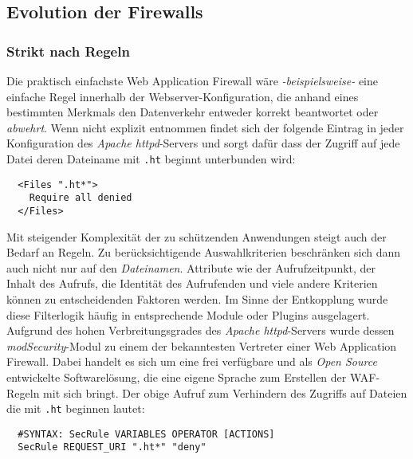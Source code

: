 \subsection{Evolution der Firewalls}

\subsubsection{Strikt nach Regeln}

Die praktisch einfachste Web Application Firewall wäre \emph{-beispielsweise-} eine einfache Regel innerhalb der Webserver-Konfiguration, die anhand eines bestimmten Merkmals den Datenverkehr entweder korrekt beantwortet oder \glqq\emph{abwehrt}\grqq. Wenn nicht explizit entnommen findet sich der folgende Eintrag in jeder Konfiguration des \emph{Apache httpd}-Servers und sorgt dafür dass der Zugriff auf jede Datei deren Dateiname mit \texttt{.ht} beginnt unterbunden wird:

\begin{lstlisting}
  <Files ".ht*">
    Require all denied
  </Files>
\end{lstlisting}

Mit steigender Komplexität der zu schützenden Anwendungen steigt auch der Bedarf an Regeln. Zu berücksichtigende Auswahlkriterien beschränken sich dann auch nicht nur auf den \glqq\emph{Dateinamen}\grqq. Attribute wie der Aufrufzeitpunkt, der Inhalt des Aufrufs, die Identität des Aufrufenden und viele andere Kriterien können zu entscheidenden Faktoren werden. Im Sinne der Entkopplung wurde diese Filterlogik häufig in entsprechende Module oder Plugins ausgelagert. Aufgrund des hohen Verbreitungsgrades des \emph{Apache httpd}-Servers wurde dessen \emph{modSecurity}-Modul zu einem der bekanntesten Vertreter einer Web Application Firewall. Dabei handelt es sich um eine frei verfügbare und als \emph{Open Source} entwickelte Softwarelösung, die eine eigene Sprache zum Erstellen der WAF-Regeln mit sich bringt. Der obige Aufruf zum Verhindern des Zugriffs auf Dateien die mit \texttt{.ht} beginnen lautet:

\begin{lstlisting}
  #SYNTAX: SecRule VARIABLES OPERATOR [ACTIONS]        
  SecRule REQUEST_URI ".ht*" "deny"
\end{lstlisting}

